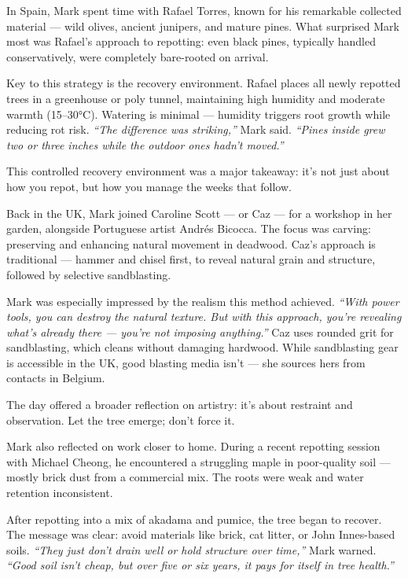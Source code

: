 \medskip
{}
\noindent
In Spain, Mark spent time with Rafael Torres, known for his remarkable collected material --- wild olives, ancient junipers, and mature pines. What surprised Mark most was Rafael's approach to repotting: even black pines, typically handled conservatively, were completely bare\--rooted on arrival.

Key to this strategy is the recovery environment. Rafael places all newly repotted trees in a greenhouse or poly tunnel, maintaining high humidity and moderate warmth (15--30°C). Watering is minimal --- humidity triggers root growth while reducing rot risk. \textit{``The difference was striking,''} Mark said. \textit{``Pines inside grew two or three inches while the outdoor ones hadn't moved.''}

This controlled recovery environment was a major takeaway: it's not just about how you repot, but how you manage the weeks that follow.

\medskip
{}
\noindent
Back in the UK, Mark joined Caroline Scott --- or Caz --- for a workshop in her garden, alongside Portuguese artist Andrés Bicocca. The focus was carving: preserving and enhancing natural movement in deadwood. Caz's approach is traditional --- hammer and chisel first, to reveal natural grain and structure, followed by selective sandblasting.

Mark was especially impressed by the realism this method achieved. \textit{``With power tools, you can destroy the natural texture. But with this approach, you're revealing what's already there --- you're not imposing anything.''}
%
Caz uses rounded grit for sandblasting, which cleans without damaging hardwood. While sandblasting gear is accessible in the UK, good blasting media isn't --- she sources hers from contacts in Belgium.

The day offered a broader reflection on artistry: it's about restraint and observation. Let the tree emerge; don't force it.

\medskip
{}
\noindent
Mark also reflected on work closer to home. During a recent repotting session with Michael Cheong, he encountered a struggling maple in poor\--quality soil --- mostly brick dust from a commercial mix. The roots were weak and water retention inconsistent.

After repotting into a mix of akadama and pumice, the tree began to recover. The message was clear: avoid materials like brick, cat litter, or John Innes-based soils. \textit{``They just don't drain well or hold structure over time,''} Mark warned. \textit{``Good soil isn't cheap, but over five or six years, it pays for itself in tree health.''}

